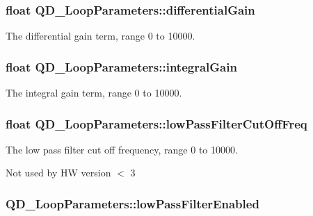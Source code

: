\subsubsection[{\texorpdfstring{differential\+Gain}{differentialGain}}]{\setlength{\rightskip}{0pt plus 5cm}float Q\+D\+\_\+\+Loop\+Parameters\+::differential\+Gain}\hypertarget{struct_q_d___loop_parameters_ab389908a74ae79151f9d63e91081ee4f}{}\label{struct_q_d___loop_parameters_ab389908a74ae79151f9d63e91081ee4f}


The differential gain term, range 0 to 10000. 

\subsubsection[{\texorpdfstring{integral\+Gain}{integralGain}}]{\setlength{\rightskip}{0pt plus 5cm}float Q\+D\+\_\+\+Loop\+Parameters\+::integral\+Gain}\hypertarget{struct_q_d___loop_parameters_a329f8d89d52f2fb5ac77e3c6a4f4faef}{}\label{struct_q_d___loop_parameters_a329f8d89d52f2fb5ac77e3c6a4f4faef}


The integral gain term, range 0 to 10000. 

\subsubsection[{\texorpdfstring{low\+Pass\+Filter\+Cut\+Off\+Freq}{lowPassFilterCutOffFreq}}]{\setlength{\rightskip}{0pt plus 5cm}float Q\+D\+\_\+\+Loop\+Parameters\+::low\+Pass\+Filter\+Cut\+Off\+Freq}\hypertarget{struct_q_d___loop_parameters_adb5f4db301162d35d0c93b29da521c54}{}\label{struct_q_d___loop_parameters_adb5f4db301162d35d0c93b29da521c54}


The low pass filter cut off frequency, range 0 to 10000. 

Not used by HW version $<$ 3
\subsubsection[{\texorpdfstring{low\+Pass\+Filter\+Enabled}{lowPassFilterEnabled}}]{ Q\+D\+\_\+\+Loop\+Parameters\+::low\+Pass\+Filter\+Enabled}\hypertarget{struct_q_d___loop_parameters_ab4031d99f00137729efdcbf3a333a915}{}\label{struct_q_d___loop_parameters_ab4031d99f00137729efdcbf3a333a915}


